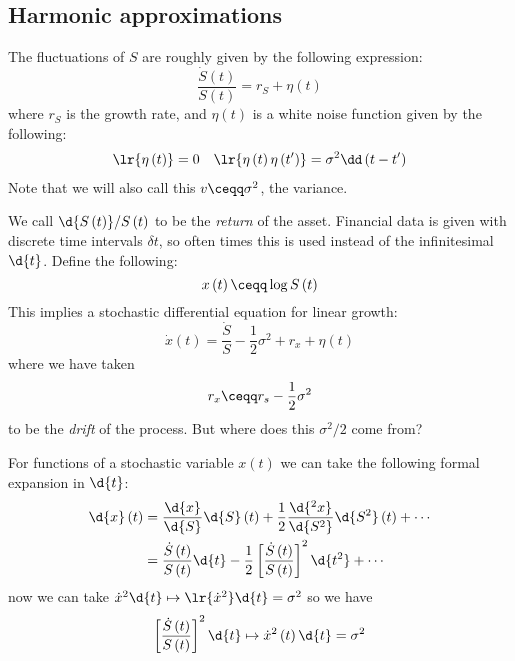 \documentclass{booc}
\begin{document}
\subsection{Harmonic approximations}

The fluctuations of $S$ are roughly given by the following expression:
\begin{equation}
\frac{\dot S\left( t \right)}{S\left( t \right)} = 
r_S + \eta\left( t \right)
\end{equation}
where $r_S$ is the growth rate, and $\eta\left( t \right)$ is a white noise
function given by the following:
\begin{align}
\lr{\eta\left( t \right)} = 0
&&
\lr{\eta\left( t \right)\eta\left( t' \right)} = \sigma^2 \dd\left( t - t' \right)
\end{align}
Note that we will also call this $v\ceqq \sigma^2$, the variance.

We call $\d{S\left( t \right)}/S\left( t \right)$ to be the \emph{return}
of the asset.
Financial data is given with discrete time intervals $\delta t$, so often
times this is used instead of the infinitesimal $\d{t}$.
Define the following:
\begin{equation}
x\left( t \right) \ceqq \log S\left( t \right)
\end{equation}
This implies a stochastic differential equation for linear growth:
\begin{equation}
\dot x \left( t \right) = \frac{\dot S}{S} - \frac{1}{2} \sigma^2 + 
r_x + \eta\left( t \right)
\end{equation}
where we have taken
\begin{equation}
r_x \ceqq r_s - \frac{1}{2}\sigma^2
\end{equation}
to be the \emph{drift} of the process. 
But where does this $\sigma^2 / 2$ come from?

For functions of a stochastic variable $x\left( t \right)$ we can take
the following formal expansion in $\d{t}$:
\begin{align}
\d{x} \left( t \right) &=
\frac{\d{x}}{\d{S}} \d{S}\left( t \right) + 
\frac{1}{2} \frac{\d{^2 x}}{\d{S^2}} \d{S^2}\left( t \right) + \cdots \\
&= \frac{\dot S\left( t \right)}{S\left( t \right)}\d{t} - 
\frac{1}{2} 
\left[ \frac{\dot S\left( t \right)}{S\left( t \right)} \right]^2 \d{t^2} + \cdots
\end{align}
now we can take $\dot x^2 \d{t}\mapsto \lr{\dot x^2} \d{t}= \sigma^2$
so we have
\begin{equation}
\left[ \frac{\dot S\left( t \right)}{S\left( t \right)} \right]^2 \d{t} \mapsto
\dot x^2 \left( t \right) \d{t} = \sigma^2
\end{equation}
\end{document}
